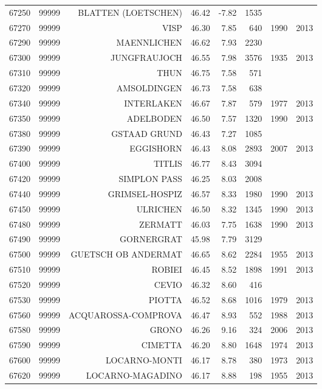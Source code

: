 \begin{longtable}{rrrrrrrr}
  67250 & 99999 & BLATTEN (LOETSCHEN) & 46.42 & -7.82 & 1535 &  &  \\ 
  67270 & 99999 & VISP & 46.30 & 7.85 & 640 & 1990 & 2013 \\ 
  67290 & 99999 & MAENNLICHEN & 46.62 & 7.93 & 2230 &  &  \\ 
  67300 & 99999 & JUNGFRAUJOCH & 46.55 & 7.98 & 3576 & 1935 & 2013 \\ 
  67310 & 99999 & THUN & 46.75 & 7.58 & 571 &  &  \\ 
  67320 & 99999 & AMSOLDINGEN & 46.73 & 7.58 & 638 &  &  \\ 
  67340 & 99999 & INTERLAKEN & 46.67 & 7.87 & 579 & 1977 & 2013 \\ 
  67350 & 99999 & ADELBODEN & 46.50 & 7.57 & 1320 & 1990 & 2013 \\ 
  67380 & 99999 & GSTAAD GRUND & 46.43 & 7.27 & 1085 &  &  \\ 
  67390 & 99999 & EGGISHORN & 46.43 & 8.08 & 2893 & 2007 & 2013 \\ 
  67400 & 99999 & TITLIS & 46.77 & 8.43 & 3094 &  &  \\ 
  67420 & 99999 & SIMPLON PASS & 46.25 & 8.03 & 2008 &  &  \\ 
  67440 & 99999 & GRIMSEL-HOSPIZ & 46.57 & 8.33 & 1980 & 1990 & 2013 \\ 
  67450 & 99999 & ULRICHEN & 46.50 & 8.32 & 1345 & 1990 & 2013 \\ 
  67480 & 99999 & ZERMATT & 46.03 & 7.75 & 1638 & 1990 & 2013 \\ 
  67490 & 99999 & GORNERGRAT & 45.98 & 7.79 & 3129 &  &  \\ 
  67500 & 99999 & GUETSCH OB ANDERMAT & 46.65 & 8.62 & 2284 & 1955 & 2013 \\ 
  67510 & 99999 & ROBIEI & 46.45 & 8.52 & 1898 & 1991 & 2013 \\ 
  67520 & 99999 & CEVIO & 46.32 & 8.60 & 416 &  &  \\ 
  67530 & 99999 & PIOTTA & 46.52 & 8.68 & 1016 & 1979 & 2013 \\ 
  67560 & 99999 & ACQUAROSSA-COMPROVA & 46.47 & 8.93 & 552 & 1988 & 2013 \\ 
  67580 & 99999 & GRONO & 46.26 & 9.16 & 324 & 2006 & 2013 \\ 
  67590 & 99999 & CIMETTA & 46.20 & 8.80 & 1648 & 1974 & 2013 \\ 
  67600 & 99999 & LOCARNO-MONTI & 46.17 & 8.78 & 380 & 1973 & 2013 \\ 
  67620 & 99999 & LOCARNO-MAGADINO & 46.17 & 8.88 & 198 & 1955 & 2013 \\ 

\end{longtable}
